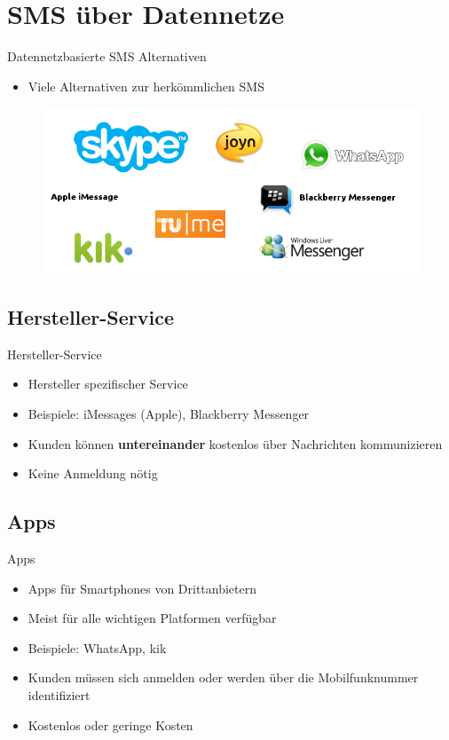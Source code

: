 \documentclass{beamer}
\begin{document}

\section{SMS über Datennetze}
\begin{frame}{Datennetzbasierte SMS Alternativen}
	\begin{itemize}
		\item Viele Alternativen zur herkömmlichen SMS
	\end{itemize}
	\begin{figure}[htm]
		\includegraphics[width=\textwidth]{img/messengers.png}
		\label{messengers}
	\end{figure}
\end{frame}

\subsection{Hersteller-Service}
\begin{frame}{Hersteller-Service}
	\begin{itemize}
		\item Hersteller spezifischer Service
		\item Beispiele: iMessages (Apple), Blackberry Messenger
		\item Kunden können \textbf{untereinander} kostenlos über Nachrichten kommunizieren
		\item Keine Anmeldung nötig
	\end{itemize}
\end{frame}

\subsection{Apps}
\begin{frame}{Apps}
	\begin{itemize}
		\item Apps für Smartphones von Drittanbietern
		\item Meist für alle wichtigen Platformen verfügbar
		\item Beispiele: WhatsApp, kik
		\item Kunden müssen sich anmelden oder werden über die Mobilfunknummer identifiziert
		\item Kostenlos oder geringe Kosten
	\end{itemize}
\end{frame}
\end{document}
